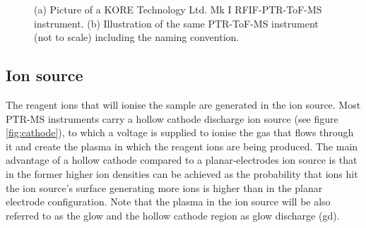 \begin{figure}%
\centering
{}

\bigskip
{}
\caption{(a) Picture of a KORE Technology Ltd. Mk I RFIF-PTR-ToF-MS instrument.  (b) Illustration of the same PTR-ToF-MS instrument (not to scale) including the naming convention.}
\label{fig:littoral}
\end{figure}



\subsection{Ion source}
The reagent ions that will ionise the sample are generated in the ion source. Most PTR-MS instruments carry a hollow cathode discharge ion source (see figure \ref{fig:cathode}), to which a voltage is supplied to ionise the gas that flows through it and create the plasma in which the reagent ions are being produced. The main advantage of a hollow cathode compared to a planar-electrodes ion source is that in the former higher ion densities can be achieved as the probability that ions hit the ion source's surface generating more ions is higher than in the planar electrode configuration. Note that the plasma in the ion source will be also referred to as the glow and the hollow cathode region as glow discharge (\acrshort{gd}).

